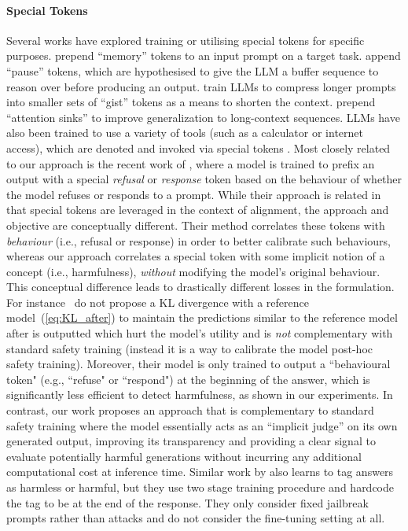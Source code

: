 \paragraph{Special Tokens} 
Several works have explored training or utilising special tokens for specific purposes.
\citet{burtsev_memory_2020} prepend ``memory'' tokens to an input prompt on a target task.
\citet{goyal_think_2023} append ``pause'' tokens, which are hypothesised to give the LLM a buffer sequence to reason over before producing an output.
\citet{mu_learning_2023} train LLMs to compress longer prompts into smaller sets of ``gist'' tokens as a means to shorten the context. 
\citet{xiao_efficient_2023} prepend ``attention sinks'' to improve generalization to long-context sequences.
LLMs have also been trained to use a variety of tools (such as a calculator or internet access), which are denoted and invoked via special tokens \citep{schick_toolformer_2023}.
Most closely related to our approach is the recent work of \citet{jain_refusal_2024}, where a model is trained to prefix an output with a special \emph{refusal} or \emph{response} token based on the behaviour of whether the model refuses or responds to a prompt.
While their approach is related in that special tokens are leveraged in the context of alignment, the approach and objective are conceptually different.
Their method correlates these tokens with \textit{behaviour} (i.e., refusal or response) in order to better calibrate such behaviours, whereas our approach correlates a special token with some implicit notion of a concept (i.e., harmfulness), \textit{without} modifying the model's original behaviour. This conceptual difference leads to drastically different losses in the formulation. For instance~\citet{jain_refusal_2024} do not propose a KL divergence with a reference model~(\cref{eq:KL_after}) to maintain the predictions similar to the reference model after \rftoken{} is outputted which hurt the model's utility and is \emph{not} complementary with standard safety training (instead it is a way to calibrate the model post-hoc safety training). Moreover, their model is only trained to output a ``behavioural token" (e.g., ``refuse" or ``respond") at the beginning of the answer, which is significantly less efficient to detect harmfulness, as shown in our experiments. In contrast, our work proposes an approach that is complementary to standard safety training where the model essentially acts as an ``implicit judge'' on its own generated output, improving its transparency and providing a clear signal to evaluate potentially harmful generations without incurring any additional computational cost at inference time. Similar work by \citet{wang_self-guard_2024} also learns to tag answers as harmless or harmful, but they use two stage training procedure and hardcode the tag to be at the end of the response. They only consider fixed jailbreak prompts rather than attacks and do not consider the fine-tuning setting at all.